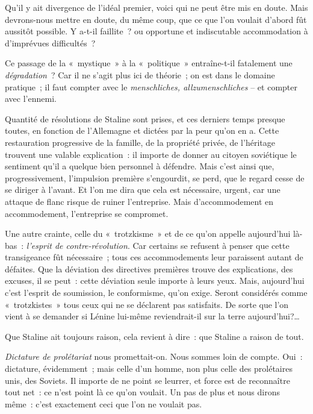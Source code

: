 \documentclass[twoside]{book} %
\newcommand{\astermono}{\medskip\centerline{\color{rubric}\large\selectfont{\syms ✻}}\medskip\par}%
\begin{document}
\noindent Qu’il y ait divergence de l’idéal premier, voici qui ne peut être mis en doute. Mais devrons-nous mettre en doute, du même coup, que ce que l’on voulait d’abord fût aussitôt possible. Y a-t-il faillite ? ou opportune et indiscutable accommodation à d’imprévues difficultés ?\par
Ce passage de la « mystique » à la « politique » entraîne-t-il fatalement une \emph{dégradation} ? Car il ne s’agit plus ici de théorie ; on est dans le domaine pratique ; il faut compter avec le \emph{menschliches, allzumenschliches} – et compter avec l’ennemi.\par
Quantité de résolutions de Staline sont prises, et ces derniers temps presque toutes, en fonction de l’Allemagne et dictées par la peur qu’on en a. Cette restauration progressive de la famille, de la propriété privée, de l’héritage trouvent une valable explication : il importe de donner au citoyen soviétique le sentiment qu’il a quelque bien personnel à défendre. Mais c’est ainsi que, progressivement, l’impulsion première s’engourdit, se perd, que le regard cesse de se diriger à l’avant. Et l’on me dira que cela est nécessaire, urgent, car une attaque de flanc risque de ruiner l’entreprise. Mais d’accommodement en accommodement, l’entreprise se compromet.\par
Une autre crainte, celle du « trotzkisme » et de ce qu’on appelle aujourd’hui là-bas : \emph{l’esprit de contre-révolution}. Car certains se refusent à penser que cette transigeance fût nécessaire ; tous ces accommodements leur paraissent autant de défaites. Que la déviation des directives premières trouve des explications, des excuses, il se peut : cette déviation seule importe à leurs yeux. Mais, aujourd’hui c’est l’esprit de soumission, le conformisme, qu’on exige. Seront considérés comme « trotzkistes » tous ceux qui ne se déclarent pas satisfaits. De sorte que l’on vient à se demander si Lénine lui-même reviendrait-il sur la terre aujourd’hui?…\par

\astermono

\noindent Que Staline ait toujours raison, cela revient à dire : que Staline a raison de tout.\par

\astermono

\noindent \emph{Dictature de prolétariat} nous promettait-on. Nous sommes loin de compte. Oui : dictature, évidemment ; mais celle d’un homme, non plus celle des prolétaires unis, des Soviets. Il importe de ne point se leurrer, et force est de reconnaître tout net : ce n’est point là ce qu’on voulait. Un pas de plus et nous dirons même : c’est exactement ceci que l’on ne voulait pas.\par
\end{document}
